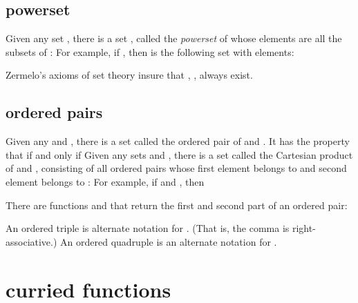 \subsection{powerset}

Given any set , there is a set , called the {\it powerset} of  whose elements are  all the subsets of :
For example, if , then  is the following set with
 elements:


Zermelo's axioms of set theory insure that , ,  always exist.

\subsection{ordered pairs}

Given any  and , there is a set  called the ordered pair
of  and .  It has the property that  if and only if
Given any sets  and , there is a set  called the Cartesian product of  and , consisting of all ordered pairs whose first element belongs to  and second element belongs to :
For example, if  and , then

There are functions  and  that return the first and second part of an ordered pair:

An ordered triple  is alternate notation for .  (That is, the comma is right-associative.)  An ordered quadruple  is an alternate notation for .  









\section{curried functions}

